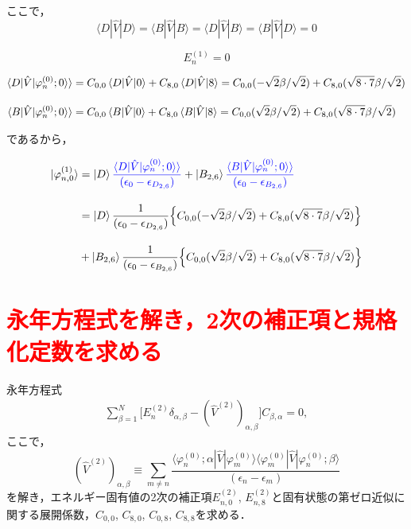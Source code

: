ここで，
\begin{equation}
    \langle{D|\hat{V}|D}\rangle
    =\langle{B|\hat{V}|B}\rangle
    =\langle{D|\hat{V}|B}\rangle
    =\langle{B|\hat{V}|D}\rangle=0
\end{equation}

\begin{equation}
    E^{(1)}_n = 0
\end{equation}

\begin{align}
    \braket{D|\hat{V}|\varphi^{(0)}_n;0}\rangle
    &=C_{0,0}\braket{D|\hat{V}|0} + C_{8,0}\braket{D|\hat{V}|8}
    =C_{0,0}(-\sqrt{2}\beta/\sqrt{2}) + C_{8,0} (\sqrt{8\cdot7}\beta/\sqrt{2})\\[10pt]
    \braket{B|\hat{V}|\varphi^{(0)}_n;0}\rangle
    &=C_{0,0}\braket{B|\hat{V}|0} + C_{8,0}\braket{B|\hat{V}|8}
    =C_{0,0}(\sqrt{2}\beta/\sqrt{2}) + C_{8,0} (\sqrt{8\cdot7}\beta/\sqrt{2})
\end{align}

であるから，

\begin{align}
    \ket{\varphi_{n,0}^{(1)}}
    &=
    \ket{D}
    \textcolor{blue}{
    \frac{\braket{D|\hat{V}|\varphi^{(0)}_n;0}\rangle}{(\epsilon_{0}-\epsilon_{D_{2,6}})}}
    +
    \ket{B_{2,6}}
    \textcolor{blue}{
    \frac{\braket{B|\hat{V}|\varphi^{(0)}_n;0}\rangle}{(\epsilon_0-\epsilon_{B_{2,6}})}}\\[10pt]
    &=\ket{D}
    \frac{1}{(\epsilon_{0}-\epsilon_{D_{2,6}})}
    \Bigl\{C_{0,0}(-\sqrt{2}\beta/\sqrt{2}) + C_{8,0} (\sqrt{8\cdot7}\beta/\sqrt{2})\Bigr\}\nn[10pt]
    &+
    \ket{B_{2,6}}
    \frac{1}{(\epsilon_{0}-\epsilon_{B_{2,6}})}
    \Bigl\{C_{0,0}(\sqrt{2}\beta/\sqrt{2}) + C_{8,0} (\sqrt{8\cdot7}\beta/\sqrt{2})\Bigr\}
\end{align}






\section*{\textcolor{red}{永年方程式を解き，2次の補正項と規格化定数を求める}}
永年方程式
\begin{align}\label{2ndpertubation_matrix}
\sum_{\beta=1}^{N}\Biggl[
E^{(2)}_n \delta_{\alpha,\beta}
-(\hat{V}^{(2)})_{\alpha,\beta}
\biggr]C_{\beta,\alpha}=0,
\end{align}
ここで，
\begin{equation}
    (\hat{V}^{(2)})_{\alpha,\beta}
    \equiv\sum_{m\neq n}
    \frac{\langle{\varphi^{(0)}_n;\alpha|\hat{V}|\varphi^{(0)}_m}\rangle
    \langle{\varphi^{(0)}_{m}|\hat{V}|\varphi^{(0)}_n;\beta}\rangle}
    {(\epsilon_n-\epsilon_m)}
\end{equation}
を解き，エネルギー固有値の2次の補正項$E_{n,0}^{(2)}$, $E_{n,8}^{(2)}$と固有状態の第ゼロ近似に関する展開係数，$C_{0,0}$, $C_{8,0}$, $C_{0,8}$, $C_{8,8}$を求める．





